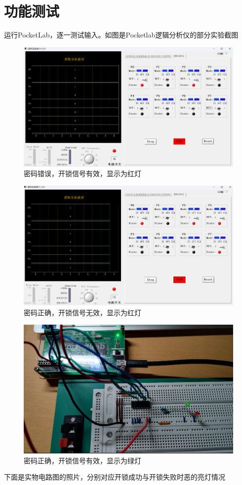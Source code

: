 \documentclass{ctexart}
\begin{document}
\section{功能测试}
运行PocketLab，逐一测试输入。如图是Pocketlab逻辑分析仪的部分实验截图
\begin{figure}[H]
    \centering
    \includegraphics[width=0.6\linewidth]{密码不正确但开锁.png}
    \caption{密码错误，开锁信号有效，显示为红灯}
    \label{fig:密码错误，开锁信号有效，显示为红灯}
\end{figure}
\begin{figure}[H]
    \centering
    \includegraphics[width=0.6\linewidth]{密码正确但不开锁.png}
    \caption{密码正确，开锁信号无效，显示为红灯}
    \label{fig:密码正确，开锁信号无效，显示为红灯}
\end{figure}
\begin{figure}[H]
    \centering
    \includegraphics[width=0.6\linewidth]{image.png}
    \caption{密码正确，开锁信号有效，显示为绿灯}
    \label{fig:密码正确，开锁信号有效，显示为绿灯}
\end{figure}
下面是实物电路图的照片，分别对应开锁成功与开锁失败时恶的亮灯情况
\end{document}
